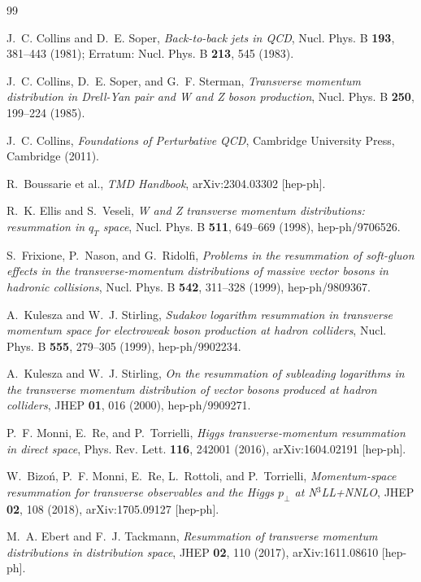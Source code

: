\documentclass[11pt]{article}
\begin{document}
\begin{thebibliography}{99}

J.~C. Collins and D.~E. Soper,
\textit{Back-to-back jets in QCD},
Nucl. Phys. B \textbf{193}, 381--443 (1981);
Erratum: Nucl. Phys. B \textbf{213}, 545 (1983).

J.~C. Collins, D.~E. Soper, and G.~F. Sterman,
\textit{Transverse momentum distribution in Drell-Yan pair and W and Z boson production},
Nucl. Phys. B \textbf{250}, 199--224 (1985).

J.~C. Collins,
\textit{Foundations of Perturbative QCD},
Cambridge University Press, Cambridge (2011).

R.~Boussarie et al.,
\textit{TMD Handbook},
arXiv:2304.03302 [hep-ph].

R.~K. Ellis and S.~Veseli,
\textit{W and Z transverse momentum distributions: resummation in $q_T$ space},
Nucl. Phys. B \textbf{511}, 649--669 (1998),
hep-ph/9706526.

S.~Frixione, P.~Nason, and G.~Ridolfi,
\textit{Problems in the resummation of soft-gluon effects in the transverse-momentum distributions of massive vector bosons in hadronic collisions},
Nucl. Phys. B \textbf{542}, 311--328 (1999),
hep-ph/9809367.

A.~Kulesza and W.~J. Stirling,
\textit{Sudakov logarithm resummation in transverse momentum space for electroweak boson production at hadron colliders},
Nucl. Phys. B \textbf{555}, 279--305 (1999),
hep-ph/9902234.

A.~Kulesza and W.~J. Stirling,
\textit{On the resummation of subleading logarithms in the transverse momentum distribution of vector bosons produced at hadron colliders},
JHEP \textbf{01}, 016 (2000),
hep-ph/9909271.

P.~F. Monni, E.~Re, and P.~Torrielli,
\textit{Higgs transverse-momentum resummation in direct space},
Phys. Rev. Lett. \textbf{116}, 242001 (2016),
arXiv:1604.02191 [hep-ph].

W.~Bizo\'n, P.~F. Monni, E.~Re, L.~Rottoli, and P.~Torrielli,
\textit{Momentum-space resummation for transverse observables and the Higgs $p_\perp$ at N$^3$LL+NNLO},
JHEP \textbf{02}, 108 (2018),
arXiv:1705.09127 [hep-ph].

M.~A. Ebert and F.~J. Tackmann,
\textit{Resummation of transverse momentum distributions in distribution space},
JHEP \textbf{02}, 110 (2017),
arXiv:1611.08610 [hep-ph].


\end{thebibliography}
\end{document}
